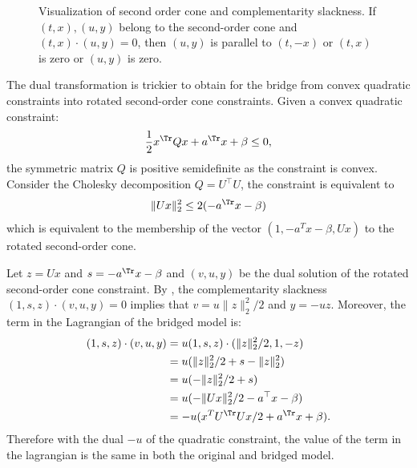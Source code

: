 \documentclass[11pt,twoside,a4paper,openright]{uclouvain-thesis}
\begin{document}
\begin{figure}
  \centering
  \caption{Visualization of second order cone and complementarity slackness.
    If $(t, x), (u, y)$ belong to the second-order cone and $(t, x) \cdot (u, y) = 0$,
    then $(u, y)$ is parallel to $(t, -x)$ or $(t, x)$ is zero or $(u, y)$ is zero.
  }
  \label{fig:socperp}
\end{figure}

\begin{myexem}
  The dual transformation is trickier to obtain for the bridge from
  convex quadratic constraints into rotated second-order cone constraints.
  Given a convex quadratic constraint:
  $$\frac{1}{2}x^\Tr Q x + a^\Tr x + \beta \le 0,$$
  the symmetric matrix $Q$ is positive semidefinite as the constraint is convex.
  Consider the Cholesky decomposition $Q = U^\top U$, the constraint is
  equivalent to
  $$\lVert U x\rVert_2^2 \le 2 (-a^\Tr x - \beta)$$
  which is equivalent to the membership of the vector $(1, -a^T x - \beta, Ux)$
  to the rotated second-order cone.

  Let $z = Ux$ and $s = -a^\Tr x - \beta$ and $(v, u, y)$ be the dual solution of the rotated second-order cone constraint.
  By , the complementarity slackness $(1, s, z) \cdot (v, u, y) = 0$
  implies that $v = u \lVert z \rVert_2^2/2$ and $y = -uz$.
  Moreover, the term in the Lagrangian of the bridged model is:
  \begin{align*}
    (1, s, z) \cdot (v, u, y)
    & = u (1, s, z) \cdot (\lVert z \rVert_2^2/2, 1, -z)\\
    & = u (\lVert z \rVert_2^2/2 + s - \lVert z \rVert_2^2)\\
    & = u (-\lVert z \rVert_2^2/2 + s)\\
    & = u (-\lVert Ux \rVert_2^2/2 - a^\top x - \beta)\\
    & = -u (x^T U^\Tr U x/2 + a^\Tr x + \beta).
  \end{align*}
  Therefore with the dual $-u$ of the quadratic constraint,
  the value of the term in the lagrangian is the same in both the original and bridged model.
\end{myexem}
\end{document}
